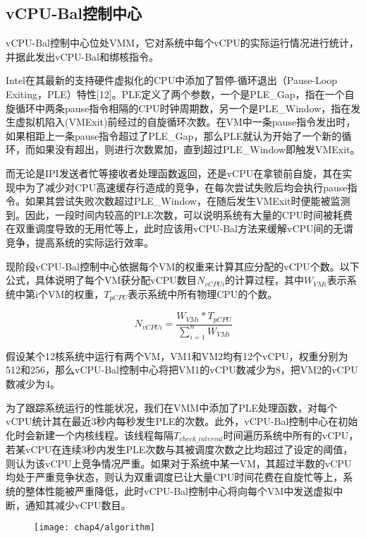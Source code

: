 \subsection{vCPU-Bal控制中心}

vCPU-Bal控制中心位处VMM，它对系统中每个vCPU的实际运行情况进行统计，并据此发出vCPU-Bal和绑核指令。

Intel在其最新的支持硬件虚拟化的CPU中添加了暂停-循环退出（Pause-Loop Exiting，PLE）特性[12]。PLE定义了两个参数，一个是PLE\_Gap，指在一个自旋循环中两条pause指令相隔的CPU时钟周期数，另一个是PLE\_Window，指在发生虚拟机陷入(VMExit)前经过的自旋循环次数。在VM中一条pause指令发出时，如果相距上一条pause指令超过了PLE\_Gap，那么PLE就认为开始了一个新的循环，而如果没有超出，则进行次数累加，直到超过PLE\_Window即触发VMExit。

而无论是IPI发送者忙等接收者处理函数返回，还是vCPU在拿锁前自旋，其在实现中为了减少对CPU高速缓存行造成的竞争，在每次尝试失败后均会执行pause指令。如果其尝试失败次数超过PLE\_Window，在随后发生VMExit时便能被监测到。因此，一段时间内较高的PLE次数，可以说明系统有大量的CPU时间被耗费在双重调度导致的无用忙等上，此时应该用vCPU-Bal方法来缓解vCPU间的无谓竞争，提高系统的实际运行效率。

现阶段vCPU-Bal控制中心依据每个VM的权重来计算其应分配的vCPU个数。以下公式，具体说明了每个VM获分配vCPU数目$N_{vCPUi}$的计算过程，其中$W_{VMi}$表示系统中第i个VM的权重，$T_{pCPU}$表示系统中所有物理CPU的个数。

\begin{equation*}
N_{vCPUi} = \frac{W_{VMi} * T_{pCPU}}{\sum_{i=1}^n W_{VMi}}
\end{equation*}

假设某个12核系统中运行有两个VM，VM1和VM2均有12个vCPU，权重分别为512和256，那么vCPU-Bal控制中心将把VM1的vCPU数减少为8，把VM2的vCPU数减少为4。

为了跟踪系统运行的性能状况，我们在VMM中添加了PLE处理函数，对每个vCPU统计其在最近3秒内每秒发生PLE的次数。此外，vCPU-Bal控制中心在初始化时会新建一个内核线程。该线程每隔$T_{check\_interval}$时间遍历系统中所有的vCPU，若某vCPU在连续3秒内发生PLE次数与其被调度次数之比均超过了设定的阈值，则认为该vCPU上竞争情况严重。如果对于系统中某一VM，其超过半数的vCPU均处于严重竞争状态，则认为双重调度已让大量CPU时间花费在自旋忙等上，系统的整体性能被严重降低，此时vCPU-Bal控制中心将向每个VM中发送虚拟中断，通知其减少vCPU数目。

\begin{figure}[!htp]
  \centering
  \texttt{[image: chap4/algorithm]}
\end{figure}

